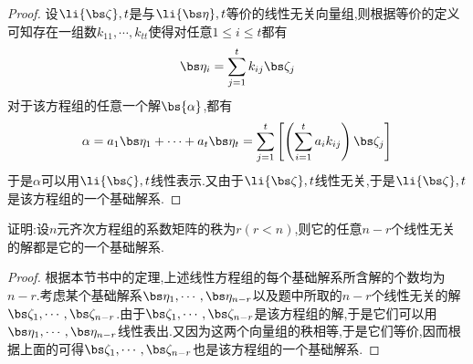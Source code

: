 \documentclass{ctexart}
\begin{document}
\begin{proof}
    设$\li{\bs\zeta},t$是与$\li{\bs\eta},t$等价的线性无关向量组,则根据等价的定义可知存在一组数$k_{11},\cdots,k_{tt}$使得对任意$1\leqslant i\leqslant t$都有
    \[\bs\eta_i=\sum_{j=1}^{t}k_{ij}\bs\zeta_j\]
    对于该方程组的任意一个解$\bs{\alpha}$,都有
    \[\alpha=a_1\bs\eta_1+\cdots+a_t\bs\eta_t=\sum_{j=1}^{t}\left[\left(\sum_{i=1}^{t}a_ik_{ij}\right)\bs\zeta_j\right]\]
    于是$\alpha$可以用$\li{\bs\zeta},t$线性表示.又由于$\li{\bs\zeta},t$线性无关,于是$\li{\bs\zeta},t$是该方程组的一个基础解系.
\end{proof}
\begin{homework}[3]
    证明:设$n$元齐次方程组的系数矩阵的秩为$r(r<n)$,则它的任意$n-r$个线性无关的解都是它的一个基础解系.
\end{homework}
\begin{proof}
    根据本节书中的定理,上述线性方程组的每个基础解系所含解的个数均为$n-r$.考虑某个基础解系$\bs\eta_1,\cdots,\bs\eta_{n-r}$以及题中所取的$n-r$个线性无关的解$\bs\zeta_1,\cdots,\bs\zeta_{n-r}$.由于$\bs\zeta_1,\cdots,\bs\zeta_{n-r}$是该方程组的解,于是它们可以用$\bs\eta_1,\cdots,\bs\eta_{n-r}$线性表出.又因为这两个向量组的秩相等,于是它们等价,因而根据上面的可得$\bs\zeta_1,\cdots,\bs\zeta_{n-r}$也是该方程组的一个基础解系.
\end{proof}
\end{document}
